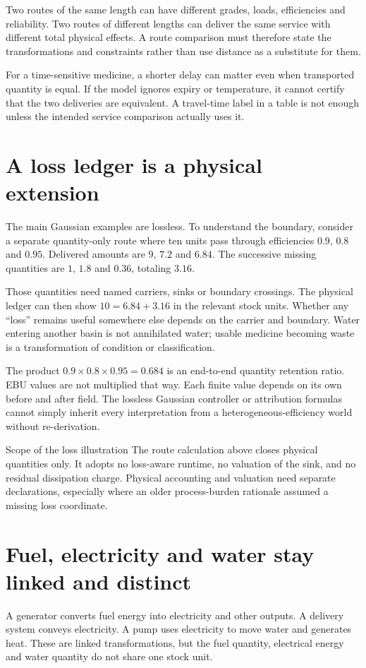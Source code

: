Two routes of the same length can have different grades, loads, efficiencies and reliability. Two routes of different lengths can deliver the same service with different total physical effects. A route comparison must therefore state the transformations and constraints rather than use distance as a substitute for them.

For a time-sensitive medicine, a shorter delay can matter even when transported quantity is equal. If the model ignores expiry or temperature, it cannot certify that the two deliveries are equivalent. A travel-time label in a table is not enough unless the intended service comparison actually uses it.

\section{A loss ledger is a physical extension}
The main Gaussian examples are lossless. To understand the boundary, consider a separate quantity-only route where ten units pass through efficiencies $0.9$, $0.8$ and $0.95$. Delivered amounts are $9$, $7.2$ and $6.84$. The successive missing quantities are $1$, $1.8$ and $0.36$, totaling $3.16$.

Those quantities need named carriers, sinks or boundary crossings. The physical ledger can then show $10=6.84+3.16$ in the relevant stock units. Whether any ``loss'' remains useful somewhere else depends on the carrier and boundary. Water entering another basin is not annihilated water; usable medicine becoming waste is a transformation of condition or classification.

The product $0.9\times0.8\times0.95=0.684$ is an end-to-end quantity retention ratio. EBU values are not multiplied that way. Each finite value depends on its own before and after field. The lossless Gaussian controller or attribution formulas cannot simply inherit every interpretation from a heterogeneous-efficiency world without re-derivation.

\begin{cautionbox}{Scope of the loss illustration}
The route calculation above closes physical quantities only. It adopts no loss-aware runtime, no valuation of the sink, and no residual dissipation charge. Physical accounting and valuation need separate declarations, especially where an older process-burden rationale assumed a missing loss coordinate.
\end{cautionbox}

\section{Fuel, electricity and water stay linked and distinct}
A generator converts fuel energy into electricity and other outputs. A delivery system conveys electricity. A pump uses electricity to move water and generates heat. These are linked transformations, but the fuel quantity, electrical energy and water quantity do not share one stock unit.


